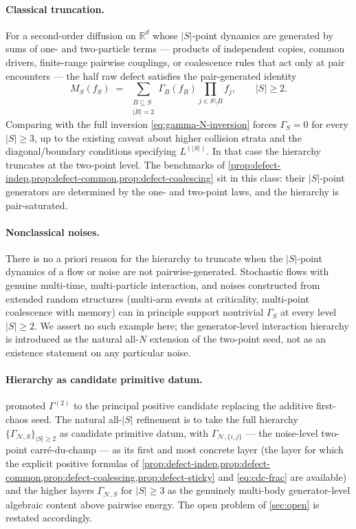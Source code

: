 \documentclass[11pt,reqno]{amsart}
\theoremstyle{plain}
\theoremstyle{definition}
\theoremstyle{remark}
\newcommand{\R}{\mathbb{R}}
\begin{document}
\paragraph{Classical truncation.}
For a second-order diffusion on $\R^{d}$ whose $|S|$-point
dynamics are generated by sums of one- and two-particle terms ---
products of independent copies, common drivers, finite-range
pairwise couplings, or coalescence rules that act only at pair
encounters --- the half raw defect satisfies the pair-generated
identity
\begin{equation}\label{eq:pair-generated}
  M_S(f_S)
  \;=\;
  \!\!\sum_{\substack{B\subseteq S\\ |B|=2}}\!\!
  \Gamma_B(f_B)\prod_{j\in S\setminus B}f_j,
  \qquad |S|\ge 2.
\end{equation}
Comparing with the full inversion \eqref{eq:gamma-N-inversion}
forces $\Gamma_S=0$ for every $|S|\ge 3$, up to the existing caveat
about higher collision strata and the diagonal/boundary conditions
specifying $L^{(|S|)}$. In that case the hierarchy truncates at the
two-point level. The benchmarks of
\cref{prop:defect-indep,prop:defect-common,prop:defect-coalescing}
sit in this class: their $|S|$-point generators are determined by
the one- and two-point laws, and the hierarchy is pair-saturated.

\paragraph{Nonclassical noises.}
There is no a priori reason for the hierarchy to truncate when the
$|S|$-point dynamics of a flow or noise are not pairwise-generated.
Stochastic flows with genuine multi-time, multi-particle interaction,
and noises constructed from extended random structures (multi-arm
events at criticality, multi-point coalescence with memory) can in
principle support nontrivial $\Gamma_S$ at every level $|S|\ge 2$.
We assert no such example here; the generator-level interaction
hierarchy is introduced as the natural all-$N$ extension of the
two-point seed, not as an existence statement on any particular
noise.

\paragraph{Hierarchy as candidate primitive datum.}
 promoted $\Gamma^{(2)}$ to the principal positive
candidate replacing the additive first-chaos seed. The natural
all-$|S|$ refinement is to take the full hierarchy
$\{\Gamma_{\mathcal N,S}\}_{|S|\ge 2}$ as candidate primitive
datum, with $\Gamma_{\mathcal N,\{i,j\}}$ --- the noise-level
two-point carr\'e-du-champ --- as its first and most concrete layer
(the layer for which the explicit positive formulas of
\cref{prop:defect-indep,prop:defect-common,prop:defect-coalescing,prop:defect-sticky}
and \eqref{eq:cdc-frac} are available) and the higher layers
$\Gamma_{\mathcal N,S}$ for $|S|\ge 3$ as the genuinely multi-body
generator-level algebraic content above pairwise energy. The open
problem of \cref{sec:open} is restated accordingly.
\end{document}
